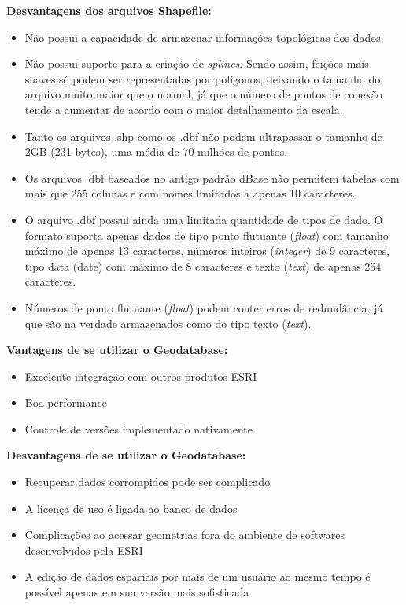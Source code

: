\textbf{Desvantagens dos arquivos Shapefile:}

	\begin{itemize}
		\item Não possui a capacidade de armazenar informações topológicas dos dados.
		\item Não possui suporte para a criação de \textit{splines}. Sendo assim, feições mais suaves só podem ser representadas por polígonos, deixando o tamanho do arquivo muito maior que o normal, já que o número de pontos de conexão tende a aumentar de acordo com o maior detalhamento da escala.
		\item Tanto os arquivos .shp como os .dbf não podem ultrapassar o tamanho de 2GB (231 bytes), uma média de 70 milhões de pontos.
		\item Os arquivos .dbf baseados no antigo padrão dBase não permitem tabelas com mais que 255 colunas e com nomes limitados a apenas 10 caracteres. 
		\item O arquivo .dbf possui ainda uma limitada quantidade de tipos de dado. O formato suporta apenas dados de tipo ponto flutuante (\textit{float}) com tamanho máximo de apenas 13 caracteres, números inteiros (\textit{integer}) de 9 caracteres, tipo data (date) com máximo de 8 caracteres e texto (\textit{text}) de apenas 254 caracteres.
		\item Números de ponto flutuante (\textit{float}) podem conter erros de redundância, já que são na verdade armazenados como do tipo texto (\textit{text}).
	\end{itemize}

\textbf{Vantagens de se utilizar o Geodatabase:}

	\begin{itemize}
		\item Excelente integração com outros produtos ESRI
		\item Boa performance
		\item Controle de versões implementado nativamente
	\end{itemize}

\textbf{Desvantagens de se utilizar o Geodatabase:}

	\begin{itemize}
		\item Recuperar dados corrompidos pode ser complicado
		\item A licença de uso é ligada ao banco de dados
		\item Complicações ao acessar geometrias fora do ambiente de softwares desenvolvidos pela ESRI
		\item A edição de dados espaciais por mais de um usuário ao mesmo tempo é possível apenas em sua versão mais sofisticada
	\end{itemize}

